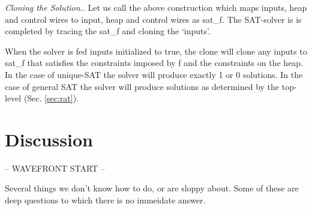 \documentclass[preprint]{sigplanconf}
\newcommand{\xcomment}[2]{\textbf{#1:~\textsl{#2}}}
\newcommand{\amr}[1]{\xcomment{Amr}{#1}}
\newcommand{\roshan}[1]{\xcomment{Roshan}{#1}}
\begin{document}

\emph{Cloning the Solution.}.  Let us call the above construction
which maps inputs, heap and control wires to input, heap and control
wires as {{sat_f}}. The SAT-solver is is completed by tracing the
{{sat_f}} and cloning the `inputs'. 

\begin{center}
\end{center}  

When the solver is fed inputs initialized to {{true}}, the {{clone}}
will clone any inputs to {{sat_f}} that satisfies the constraints
imposed by {{f}} and the constraints on the {{heap}}. In the case of
unique-SAT the solver will produce exactly 1 or 0 solutions. In the
case of general SAT the solver will produce solutions as determined by
the top-level (Sec. \ref{sec:rat}).




\section{Discussion}

-- WAVEFRONT START --


Several things we don't know how to do, or are sloppy about. Some of
these are deep questions to which there is no immeidate answer.
\end{document}

